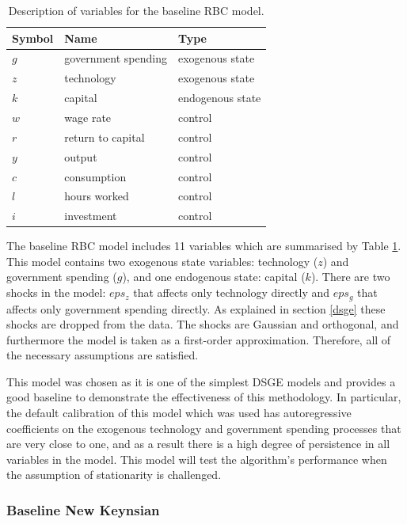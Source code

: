 \documentclass{article}
\begin{document}
\begin{table}
  \centering
  \begin{tabular}{|l|l|l|}
    \hline
    Symbol & Name & Type \\
    \hline
    $g$ & government spending & exogenous state \\
    $z$ & technology & exogenous state \\
    $k$ & capital & endogenous state \\
    $w$ & wage rate & control \\
    $r$ & return to capital & control \\
    $y$ & output & control \\
    $c$ & consumption & control \\
    $l$ & hours worked & control \\
    $i$ & investment & control \\ \cline{2-2}
    \hline
  \end{tabular}
  \caption{Description of variables for the baseline RBC model.}
  \label{rbc_data}
\end{table}

The baseline RBC model includes 11 variables which are summarised by Table \ref{rbc_data}. This model contains two exogenous state variables: technology ($z$) and government spending ($g$), and one endogenous state: capital ($k$). There are two shocks in the model: $eps_z$ that affects only technology directly and $eps_g$ that affects only government spending directly. As explained in section \ref{dsge} these shocks are dropped from the data. The shocks are Gaussian and orthogonal, and furthermore the model is taken as a first-order approximation. Therefore, all of the necessary assumptions are satisfied.

This model was chosen as it is one of the simplest DSGE models and provides a good baseline to demonstrate the effectiveness of this methodology. In particular, the default calibration of this model which was used has autoregressive coefficients on the exogenous technology and government spending processes that are very close to one, and as a result there is a high degree of persistence in all variables in the model. This model will test the algorithm's performance when the assumption of stationarity is challenged.

\subsubsection{Baseline New Keynsian}
\end{document}
